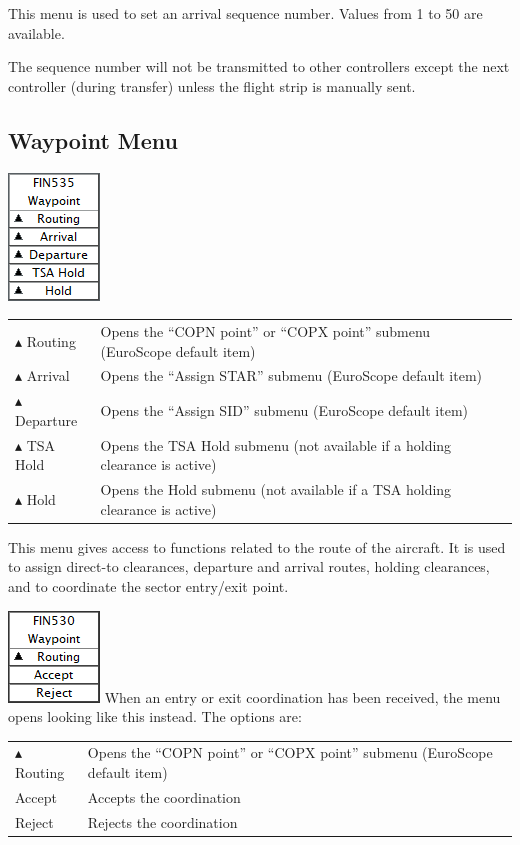 \documentclass[11pt,a4paper,oldfontcommands]{memoir}
\begin{document}
This menu is used to set an arrival sequence number. Values from 1 to 50 are available.

The sequence number will not be transmitted to other controllers except the next
controller (during transfer) unless the flight strip is manually sent.

\subsection{Waypoint Menu}
\label{menu:wpt}
\includegraphics{img/wpt.png}

\begin{tabular}{l l}
$\blacktriangle$  Routing & Opens the “COPN point” or “COPX point” submenu (EuroScope default item)
\\$\blacktriangle$ Arrival & Opens the “Assign STAR” submenu (EuroScope default item)
\\$\blacktriangle$ Departure & Opens the “Assign SID” submenu (EuroScope default item)
\\$\blacktriangle$ TSA Hold & Opens the TSA Hold submenu (not available if a holding clearance is active)
\\$\blacktriangle$ Hold & Opens the Hold submenu (not available if a TSA holding clearance is active)
\end{tabular}

This menu gives access to functions related to the route of the aircraft. It is used to assign
direct-to clearances, departure and arrival routes, holding clearances, and to coordinate
the sector entry/exit point.

\includegraphics{img/wptyn.png}
When an entry or exit coordination has been received, the menu opens looking like this
instead. The options are:

\begin{tabular}{l l}
$\blacktriangle$ Routing    & Opens the “COPN point” or “COPX point” submenu (EuroScope default item)
\\Accept                      & Accepts the coordination
\\Reject                      & Rejects the coordination
\end{tabular}
\end{document}
